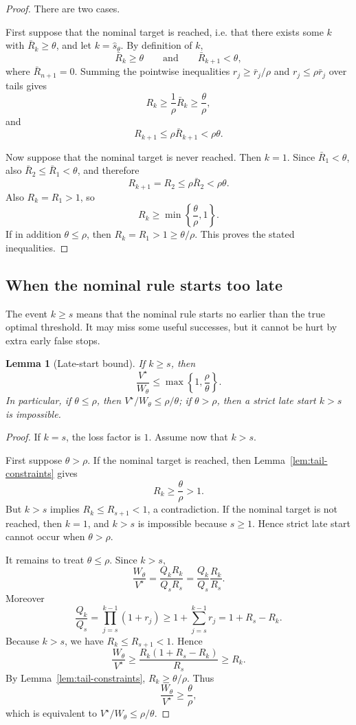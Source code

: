 \documentclass[11pt,a4paper]{article}
\newtheorem{lemma}{Lemma}
\begin{document}
\begin{proof}
There are two cases.

First suppose that the nominal target is reached, i.e. that there exists some
\(k\) with \(\bar R_k\ge\theta\), and let \(k=\hat s_\theta\).  By definition of
\(k\),
\[
  \bar R_k\ge\theta
  \qquad\text{and}\qquad
  \bar R_{k+1}<\theta,
\]
where \(\bar R_{n+1}=0\).  Summing the pointwise inequalities
\(r_j\ge\bar r_j/\rho\) and \(r_j\le\rho\bar r_j\) over tails gives
\[
  R_k\ge\frac1\rho\bar R_k\ge\frac{\theta}{\rho},
\]
and
\[
  R_{k+1}\le\rho\bar R_{k+1}<\rho\theta.
\]

Now suppose that the nominal target is never reached.  Then \(k=1\).  Since
\(\bar R_1<\theta\), also \(\bar R_2\le\bar R_1<\theta\), and therefore
\[
  R_{k+1}=R_2\le\rho\bar R_2<\rho\theta.
\]
Also \(R_k=R_1>1\), so
\[
  R_k\ge \min\left\{\frac{\theta}{\rho},1\right\}.
\]
If in addition \(\theta\le\rho\), then \(R_k=R_1>1\ge\theta/\rho\).  This proves
the stated inequalities.
\end{proof}

\subsection{When the nominal rule starts too late}

The event \(k\ge s\) means that the nominal rule starts no earlier than the
true optimal threshold.  It may miss some useful successes, but it cannot be
hurt by extra early false stops.

\begin{lemma}[Late-start bound]
\label{lem:late}
If \(k\ge s\), then
\[
  \frac{V^\star}{W_\theta}
  \le
  \max\left\{1,\frac{\rho}{\theta}\right\}.
\]
In particular, if \(\theta\le\rho\), then \(V^\star/W_\theta\le\rho/\theta\);
if \(\theta>\rho\), then a strict late start \(k>s\) is impossible.
\end{lemma}

\begin{proof}
If \(k=s\), the loss factor is \(1\).  Assume now that \(k>s\).

First suppose \(\theta>\rho\).  If the nominal target is reached, then
Lemma~\ref{lem:tail-constraints} gives
\[
  R_k\ge\frac{\theta}{\rho}>1.
\]
But \(k>s\) implies \(R_k\le R_{s+1}<1\), a contradiction.  If the nominal
target is not reached, then \(k=1\), and \(k>s\) is impossible because
\(s\ge1\).  Hence strict late start cannot occur when \(\theta>\rho\).

It remains to treat \(\theta\le\rho\).  Since \(k>s\),
\[
  \frac{W_\theta}{V^\star}
  =
  \frac{Q_kR_k}{Q_sR_s}
  =
  \frac{Q_k}{Q_s}\frac{R_k}{R_s}.
\]
Moreover
\[
  \frac{Q_k}{Q_s}
  =
  \prod_{j=s}^{k-1}(1+r_j)
  \ge
  1+\sum_{j=s}^{k-1}r_j
  =
  1+R_s-R_k.
\]
Because \(k>s\), we have \(R_k\le R_{s+1}<1\).  Hence
\[
  \frac{W_\theta}{V^\star}
  \ge
  \frac{R_k(1+R_s-R_k)}{R_s}
  \ge
  R_k.
\]
By Lemma~\ref{lem:tail-constraints}, \(R_k\ge\theta/\rho\).  Thus
\[
  \frac{W_\theta}{V^\star}\ge\frac{\theta}{\rho},
\]
which is equivalent to \(V^\star/W_\theta\le\rho/\theta\).
\end{proof}
\end{document}
